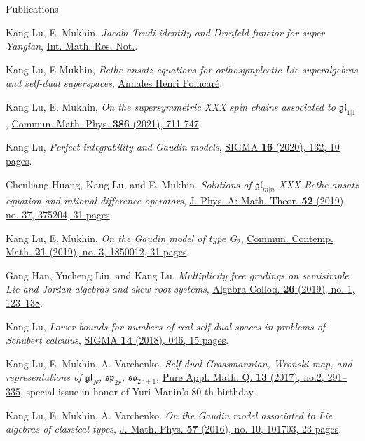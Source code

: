 \documentclass{resume} %
\begin{document}
\begin{rSection}{Publications}
\begin{etaremune}[leftmargin=0cm]
\item Kang Lu, E. Mukhin, {\it Jacobi-Trudi identity and Drinfeld functor for super Yangian}, \href{https://dx.doi.org/10.1093/imrn/rnab023}{Int. Math. Res. Not.}.

\item Kang Lu, E Mukhin, {\it Bethe ansatz equations for orthosymplectic Lie superalgebras and self-dual superspaces}, \href{https://doi.org/10.1007/s00023-021-01091-8}{Annales Henri Poincar\'{e}}.

\item Kang Lu, E. Mukhin, {\it On the supersymmetric XXX spin chains associated to $\mathfrak{gl}_{1|1}$}, \href{https://dx.doi.org/10.1007/s00220-021-04155-2}{Commun. Math. Phys. \textbf{386} (2021), 711-747}.

\item Kang Lu, {\it Perfect integrability and Gaudin models}, \href{https://doi.org/10.3842/SIGMA.2020.132}{SIGMA {\bf 16} (2020), 132, 10 pages}.

\item Chenliang Huang, Kang Lu, and E. Mukhin.
{\it Solutions of $\mathfrak{gl}_{m|n}$ XXX Bethe ansatz equation and rational difference operators}, \href{https://doi.org/10.1088/1751-8121/ab1960}{J. Phys. A: Math. Theor. \textbf{52} (2019), no. 37, 375204, 31 pages}.	
			
\item Kang Lu, E. Mukhin. 
{\it On the Gaudin model of type G$_2$}, \href{https://doi.org/10.1142/S0219199718500128}{Commun. Contemp. Math. \textbf{21} (2019), no. 3, 1850012, 31 pages}.

\item Gang Han, Yucheng Liu, and Kang Lu. {\it Multiplicity free gradings on semisimple Lie and Jordan algebras and skew root systems}, \href{https://doi.org/10.1142/S1005386719000129}{Algebra Colloq. {\bf 26} (2019), no. 1, 123--138}.
			
\item Kang Lu, {\it Lower bounds for numbers of real self-dual spaces in problems of Schubert calculus}, \href{https://doi.org/10.3842/SIGMA.2018.046}{SIGMA {\bf 14} (2018), 046, 15 pages}.	
			
\item Kang Lu, E. Mukhin, A. Varchenko. 
{\it Self-dual Grassmannian, Wronski map, and representations of $\mathfrak{gl}_N$, $\mathfrak{sp}_{2r}$, $\mathfrak{so}_{2r+1}$}, \href{http://dx.doi.org/10.4310/PAMQ.2017.v13.n2.a4}{Pure Appl. Math. Q. {\bf 13} (2017), no.2, 291--335}, special issue in honor of Yuri Manin's 80-th birthday.
					
\item Kang Lu, E. Mukhin, A. Varchenko. 
{\it On the Gaudin model associated to Lie algebras of classical types}, \href{https://doi.org/10.1063/1.4964389}{J. Math. Phys. {\bf 57} (2016), no. 10, 101703, 23 pages}.
\end{etaremune}
\end{rSection}
\end{document}
